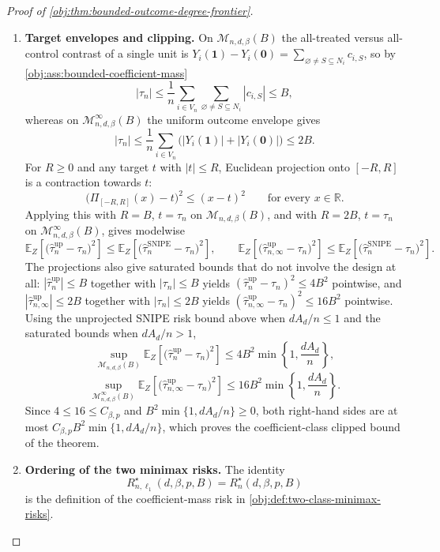\begin{proof}[Proof of \cref{obj:thm:bounded-outcome-degree-frontier}]
\begin{enumerate}
\item \textbf{Target envelopes and clipping.}
On \(\mathcal M_{n,d,\beta}(B)\) the all-treated versus all-control contrast of a
single unit is \(Y_i(\mathbf 1)-Y_i(\mathbf 0)=\sum_{\varnothing\ne S\subseteq N_i}c_{i,S}\),
so by \cref{obj:ass:bounded-coefficient-mass}
\[
|\tau_n|
\le
\frac1n\sum_{i\in V_n}\sum_{\varnothing\ne S\subseteq N_i}|c_{i,S}|
\le B ,
\]
whereas on \(\mathcal M_{n,d,\beta}^{\infty}(B)\) the uniform outcome envelope gives
\[
|\tau_n|
\le
\frac1n\sum_{i\in V_n}\bigl(|Y_i(\mathbf 1)|+|Y_i(\mathbf 0)|\bigr)
\le 2B .
\]
For \(R\ge0\) and any target \(t\) with \(|t|\le R\), Euclidean projection onto
\([-R,R]\) is a contraction towards \(t\):
\[
\bigl(\Pi_{[-R,R]}(x)-t\bigr)^2\le (x-t)^2
\qquad\text{for every }x\in\mathbb R .
\]
Applying this with \(R=B\), \(t=\tau_n\) on \(\mathcal M_{n,d,\beta}(B)\), and with
\(R=2B\), \(t=\tau_n\) on \(\mathcal M_{n,d,\beta}^{\infty}(B)\), gives modelwise
\[
\mathbb E_Z\!\left[\bigl(\widehat\tau_n^{\mathrm{up}}-\tau_n\bigr)^2\right]
\le
\mathbb E_Z\!\left[\bigl(\widehat\tau_n^{\mathrm{SNIPE}}-\tau_n\bigr)^2\right],
\qquad
\mathbb E_Z\!\left[\bigl(\widehat\tau_{n,\infty}^{\mathrm{up}}-\tau_n\bigr)^2\right]
\le
\mathbb E_Z\!\left[\bigl(\widehat\tau_n^{\mathrm{SNIPE}}-\tau_n\bigr)^2\right].
\]
The projections also give saturated bounds that do not involve the design at
all: \(|\widehat\tau_n^{\mathrm{up}}|\le B\) together with \(|\tau_n|\le B\)
yields \((\widehat\tau_n^{\mathrm{up}}-\tau_n)^2\le 4B^2\) pointwise, and
\(|\widehat\tau_{n,\infty}^{\mathrm{up}}|\le 2B\) together with
\(|\tau_n|\le 2B\) yields
\((\widehat\tau_{n,\infty}^{\mathrm{up}}-\tau_n)^2\le 16B^2\) pointwise.  Using the unprojected SNIPE risk bound above when \(dA_d/n\le1\) and the
saturated bounds when \(dA_d/n>1\),
\[
\sup_{\mathcal M_{n,d,\beta}(B)}
\mathbb E_Z\!\left[
\bigl(\widehat\tau_n^{\mathrm{up}}-\tau_n\bigr)^2
\right]
\le
4B^2\min\!\left\{1,\frac{dA_d}{n}\right\},
\]
\[
\sup_{\mathcal M_{n,d,\beta}^{\infty}(B)}
\mathbb E_Z\!\left[
\bigl(\widehat\tau_{n,\infty}^{\mathrm{up}}-\tau_n\bigr)^2
\right]
\le
16B^2\min\!\left\{1,\frac{dA_d}{n}\right\}.
\]
Since \(4\le16\le C_{\beta,p}\) and \(B^2\min\{1,dA_d/n\}\ge0\), both right-hand
sides are at most \(C_{\beta,p}B^2\min\{1,dA_d/n\}\), which proves the
coefficient-class clipped bound of the theorem.

\item \textbf{Ordering of the two minimax risks.}
The identity
\[
R_{n,\ell_1}^{\star}(d,\beta,p,B)=R_n^{\star}(d,\beta,p,B)
\]
is the definition of the coefficient-mass risk in
\cref{obj:def:two-class-minimax-risks}.


\end{enumerate}
\end{proof}
